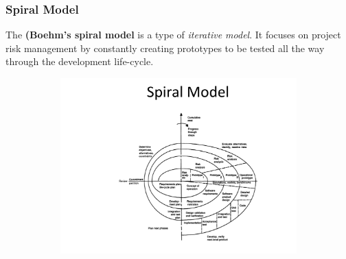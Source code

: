 \documentclass[a4paper]{article}
\begin{document}
\subsubsection{Spiral Model}
The \textbf{(Boehm's spiral model} is a type of \textit{iterative model}. It focuses on project risk management by constantly creating prototypes to be tested all the way through the development life-cycle.

\begin{figure}[H]
\hskip-2.5cm\begin{subfigure}{1.2\textwidth}
  \includegraphics[width=1.2\linewidth]
  {images/3-spiral.png}
\end{subfigure}
\end{figure}
\end{document}
